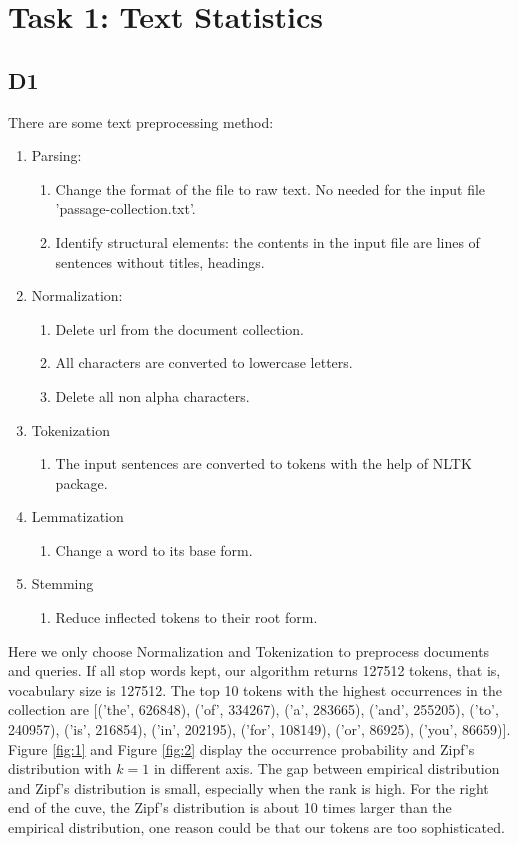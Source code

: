 \section{Task 1: Text Statistics}
\subsection{D1}
There are some text preprocessing method:
\begin{enumerate}
    \item Parsing:
    \begin{enumerate}
        \item Change the format of the file to raw text. No needed for the input file 'passage-collection.txt'.
        \item Identify structural elements: the contents in the input file are lines of sentences without titles, headings.
    \end{enumerate}
    \item Normalization:
    \begin{enumerate}
        \item Delete url from the document collection.
        \item All characters are converted to lowercase letters.
        \item Delete all non alpha characters.
    \end{enumerate}
    \item Tokenization
    \begin{enumerate}
        \item The input sentences are converted to tokens with the help of NLTK package.
    \end{enumerate}
    \item Lemmatization
    \begin{enumerate}
        \item Change a word to its base form.
    \end{enumerate}
    \item Stemming
    \begin{enumerate}
        \item Reduce inflected tokens to their root form.
    \end{enumerate}
\end{enumerate}
Here we only choose Normalization and Tokenization to preprocess documents and queries. If all stop words kept, our algorithm returns 127512 tokens, that is, vocabulary size is 127512. The top 10 tokens with the highest occurrences in the collection are [('the', 626848), ('of', 334267), ('a', 283665), ('and', 255205), ('to', 240957), ('is', 216854), ('in', 202195), ('for', 108149), ('or', 86925), ('you', 86659)]. Figure \ref{fig:1} and Figure \ref{fig:2} display the occurrence probability and Zipf's distribution with $k=1$ in different axis. The gap between empirical distribution and Zipf's distribution is small, especially when the rank is high. For the right end of the cuve, the Zipf's distribution is about 10 times larger than the empirical distribution, one reason could be that our tokens are too sophisticated. 
